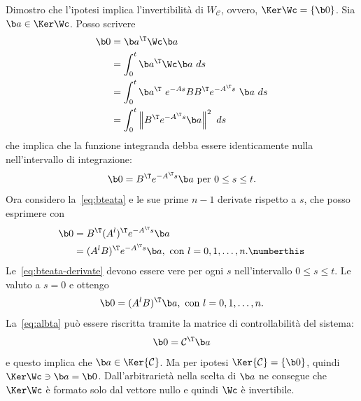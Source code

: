 \begin{steps}
    \item Dimostro che l'ipotesi implica l'invertibilità di $W_{\mathcal C}$, ovvero,
    $\Ker \Wc = \{\b 0\}$.
    Sia $\b a \in \Ker \Wc$.
    Posso scrivere
    \begin{align*}
        \b 0 &= \b a^\T \Wc \b a \\
        &= \int_0^t \b a^\T \Wc \b a \ ds \\
        &= \int_0^t \b a^{\T}\ e^{-As} B B^\T e^{-A^\T s} \ \b a \ ds \\
        &= \int_0^t \left\| B^\T e^{-A^\T s} \b a \right\|^2\ ds
    \end{align*}
    che implica che la funzione integranda debba essere identicamente nulla nell'intervallo di
    integrazione:
    \begin{equation}
        \b 0 = B^\T e^{-A^\T s} \b a  \text{ per } 0 \leq s \leq t.
        \label{eq:bteata}
    \end{equation}
    Ora considero la~\eqref{eq:bteata} e le sue prime $n-1$ derivate rispetto
    a $s$, che posso esprimere con
    \begin{align*}
        \b 0 &= B^{\T} (A^l)^{\T} e^{-A^\T s} \b a\\
        &= (A^l B)^{\T}e^{-A^\T s} \b a , \text{ con } l = {0, 1, \ldots, n}. \numberthis \label{eq:bteata-derivate}
    \end{align*}
    Le~\eqref{eq:bteata-derivate} devono essere vere per ogni $s$ nell'intervallo $0 \leq s \leq t$.
    Le valuto a $s = 0$ e ottengo
    \begin{equation}
        \b 0 = (A^l B)^{\T} \b a , \text{ con } l = {0, 1, \ldots, n}.
        \label{eq:albta}
    \end{equation}
    La~\eqref{eq:albta} può essere riscritta tramite la matrice di controllabilità del sistema:
    \begin{equation*}
        \b 0 = \mathcal C^{\T} \b a
    \end{equation*}
    e questo implica che $\b a \in \Ker{\mathcal C}$.
    Ma per ipotesi $\Ker{\mathcal C} = \{\b 0\}$, quindi $\Ker \Wc \ni \b a = \b 0$.
    Dall'arbitrarietà nella scelta di $\b a$ ne consegue che $\Ker \Wc$ è formato solo
    dal vettore nullo e quindi $\Wc$ è invertibile.


\end{steps}

